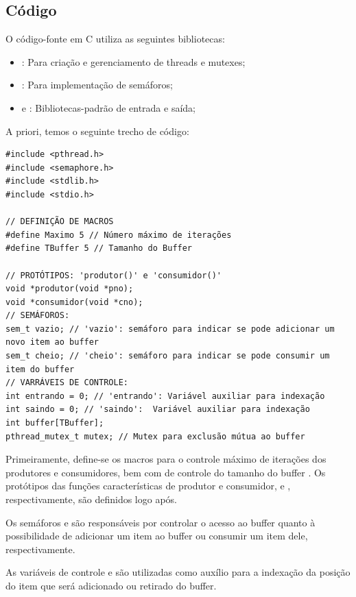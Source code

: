 \documentclass[
	12pt,				%
	openright,			%
	oneside,			%
	a4paper,			%
	chapter=TITLE,		%
	english,			%
	french,				%
	spanish,			%
	brazil				%
	]{abntex2}
\theoremstyle{definition}
\begin{document}
\subsection{Código}
O código-fonte em C utiliza as seguintes bibliotecas:
\begin{itemize}
    \item \textbf{}: Para criação e gerenciamento de threads e mutexes;
    \item \textbf{}: Para implementação de semáforos;
    \item \textbf{} e \textbf{}: Bibliotecas-padrão de entrada e saída;
\end{itemize}

A priori, temos o seguinte trecho de código:
\begin{verbatim}
#include <pthread.h>
#include <semaphore.h>
#include <stdlib.h>
#include <stdio.h>

// DEFINIÇÃO DE MACROS
#define Maximo 5 // Número máximo de iterações
#define TBuffer 5 // Tamanho do Buffer

// PROTÓTIPOS: 'produtor()' e 'consumidor()' 
void *produtor(void *pno);
void *consumidor(void *cno);
// SEMÁFOROS:
sem_t vazio; // 'vazio': semáforo para indicar se pode adicionar um novo item ao buffer
sem_t cheio; // 'cheio': semáforo para indicar se pode consumir um item do buffer 
// VARRÁVEIS DE CONTROLE:
int entrando = 0; // 'entrando': Variável auxiliar para indexação
int saindo = 0; // 'saindo':  Variável auxiliar para indexação
int buffer[TBuffer]; 
pthread_mutex_t mutex; // Mutex para exclusão mútua ao buffer 
\end{verbatim}

Primeiramente, define-se os macros para o controle máximo de iterações  dos produtores e consumidores, bem com de controle do tamanho do buffer . Os protótipos das funções características de produtor e consumidor,  e , respectivamente, são definidos logo após. 

Os semáforos  e  são responsáveis por controlar o acesso ao buffer quanto à possibilidade de adicionar um item ao buffer ou consumir um item dele, respectivamente.

As variáveis de controle  e  são utilizadas como auxílio para a indexação da posição do item que será adicionado ou retirado do buffer.
\end{document}
